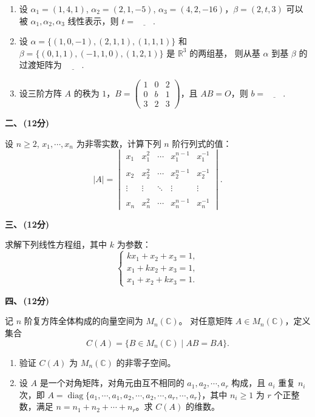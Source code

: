 \begin{enumerate}
    \item 设 $\alpha_1 = (1, 4, 1)$, $\alpha_2 = (2, 1, -5)$, $\alpha_3 = (4, 2, -16)$，$\beta = (2, t, 3)$ 可以被 $\alpha_1, \alpha_2, \alpha_3$ 线性表示，则 $t = \underline{\qquad}$.

    \item 设 $\alpha = \{(1, 0, -1), (2, 1, 1), (1, 1, 1)\}$ 和 $\beta = \{(0, 1, 1), (-1, 1, 0), (1, 2, 1)\}$ 是 $\mathbb{R}^3$ 的两组基，
    则从基 $\alpha$ 到基 $\beta$ 的过渡矩阵为 $\underline{\qquad}$.

    \item 设三阶方阵 $A$ 的秩为 $1$，$B = \begin{pmatrix}
        1 & 0 & 2 \\
        0 & b & 1 \\
        3 & 2 & 3
    \end{pmatrix}$，且 $AB = O$，则 $b = \underline{\qquad}$.
\end{enumerate}

\textbf{二、\,(12分)}

设 $n \ge 2$, $x_1, \cdots, x_n$ 为非零实数，计算下列 $n$ 阶行列式的值：
\[
|A| = \begin{vmatrix}
    x_1 & x_1^2 & \cdots & x_1^{n-1} & x_1^{-1} \\ \\
    x_2 & x_2^2 & \cdots & x_2^{n-1} & x_2^{-1} \\ \\
    \vdots & \vdots & \ddots & \vdots & \vdots \\ \\
    x_n & x_n^2 & \cdots & x_n^{n-1} & x_n^{-1}
\end{vmatrix}.
\]

\textbf{三、\,(12分)}

求解下列线性方程组，其中 $k$ 为参数：
\[
\begin{cases}
    k x_1 + x_2 + x_3 = 1, \\
    x_1 + k x_2 + x_3 = 1, \\
    x_1 + x_2 + k x_3 = 1.
\end{cases}
\]

\textbf{四、\,(12分)}

记 $n$ 阶复方阵全体构成的向量空间为 $M_n(\mathbb{C})$。
对任意矩阵 $A \in M_n(\mathbb{C})$，定义集合
\[
C(A) = \{ B \in M_n(\mathbb{C}) \mid AB = BA \}.
\]
\begin{enumerate}
    \item 验证 $C(A)$ 为 $M_n(\mathbb{C})$ 的非零子空间。
    \item 设 $A$ 是一个对角矩阵，对角元由互不相同的 $a_1, a_2, \cdots, a_r$ 构成，且 $a_i$ 重复 $n_i$ 次，即 $A = \operatorname{diag}\{a_1, \cdots, a_1, a_2, \cdots, a_2, \cdots, a_r, \cdots, a_r\}$，其中 $n_i \geq 1$ 为 $r$ 个正整数，满足 $n = n_1 + n_2 + \cdots + n_r$。求 $C(A)$ 的维数。
\end{enumerate}

